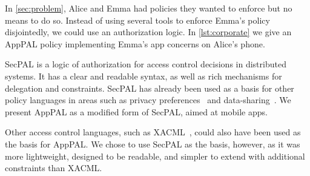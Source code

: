 \documentclass[]{llncs}
\begin{document}
In \autoref{sec:problem}, Alice and Emma had policies they wanted to enforce but no means to do so.
Instead of using several tools to enforce Emma's policy disjointedly, we could use an authorization logic.
In \autoref{lst:corporate} we give an AppPAL policy implementing Emma's app concerns on Alice's phone.

SecPAL is a logic of authorization for access control decisions in distributed systems.
It has a clear and readable syntax, as well as rich mechanisms for delegation and constraints.
SecPAL has already been used as a basis for other policy languages in areas such as privacy preferences~\cite{Becker:2009ula} and data-sharing~\cite{Aziz:2011vt}.
We present AppPAL as a modified form of SecPAL, aimed at mobile apps.

Other access control languages, such as XACML~\cite{Oasis:1M71_oFS}, could also have been used as the basis for AppPAL.
We chose to use SecPAL as the basis, however, as it was more lightweight, designed to be readable, and simpler to extend with additional constraints than XACML.
\end{document}
